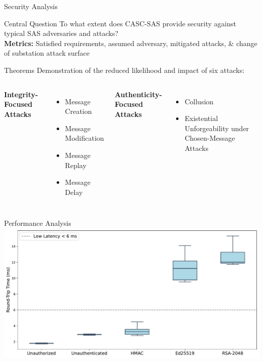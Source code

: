 \documentclass[en]{sdqbeamer}
\begin{document}
\begin{frame}{Security Analysis}
    \begin{greenblock}{Central Question}
        To what extent does CASC-SAS provide security against typical SAS adversaries and attacks?
        \\\textbf{Metrics:} Satisfied requirements, assumed adversary, mitigated attacks, \& change of substation attack surface
    \end{greenblock}
    \begin{blueblock}{Theorems}
        Demonstration of the reduced likelihood and impact of six attacks:
        \vspace{1em}
        \begin{columns}[T, onlytextwidth]
            \textbf{Integrity-Focused Attacks}
            \begin{itemize}
                \item Message Creation
                \item Message Modification
                \item Message Replay
                \item Message Delay
            \end{itemize}
            \textbf{Authenticity-Focused Attacks}
            \begin{itemize}
                \item Collusion
                \item Existential Unforgeability under Chosen-Message Attacks
            \end{itemize}
        \end{columns}
    \end{blueblock}
\end{frame}
\begin{frame}{Performance Analysis}
    \centering
    \includegraphics[height=0.75\textheight]{./figures/boxplot_without_casa.pdf}
\end{frame}
\end{document}
